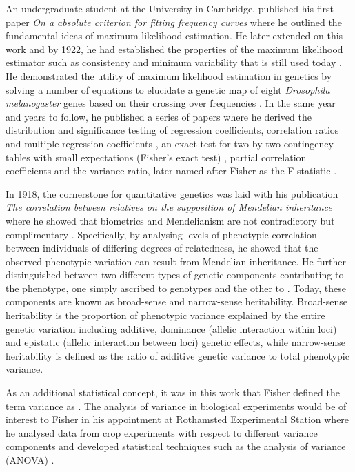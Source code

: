 An undergraduate student at the University in Cambridge, \citet{Fisher1912} published his first paper \textit{On a absolute criterion for fitting frequency curves} where he outlined the fundamental ideas of maximum likelihood estimation. He later extended on this work and by 1922, he had established the properties of the maximum likelihood estimator such as consistency and minimum variability \citep{Fisher1922a} that is still used today \citep{Hald1999}. He demonstrated the utility of maximum likelihood estimation in genetics by solving a number of equations to elucidate a genetic map of eight \textit{Drosophila melanogaster} genes based on their crossing over frequencies \citep{Fisher1922b}. In the same year and years to follow, he published a series of papers where he derived the distribution and significance testing of regression coefficients, correlation ratios and multiple regression coefficients \citep{Fisher1922c,Fisher1928}, an exact test for two-by-two contingency tables with small expectations (Fisher's exact test) \citep{Fisher1922d}, partial correlation coefficients \citep{Fisher1924a} and the variance ratio, later named after Fisher as the F statistic \citep{Fisher1924b}. 

In 1918, the cornerstone for quantitative genetics was laid with his publication \textit{The correlation between relatives on the supposition of Mendelian inheritance} where he showed that biometrics and Mendelianism are not contradictory but complimentary \citep{Fisher1918}. Specifically, by analysing levels of phenotypic correlation between individuals of differing degrees of relatedness, he showed that the observed phenotypic variation can result from Mendelian inheritance. He further distinguished between two different types of genetic components contributing to the phenotype, one simply ascribed to genotypes and the other to . Today, these components are known as broad-sense and narrow-sense heritability. Broad-sense heritability is the proportion of phenotypic variance explained by the entire genetic variation including additive, dominance (allelic interaction within loci) and epistatic (allelic interaction between loci) genetic effects, while narrow-sense heritability is defined as the ratio of additive genetic variance to total phenotypic variance. 

As an additional statistical concept, it was in this work that Fisher defined the term variance as . The analysis of variance in biological experiments would be of interest to Fisher in his appointment at Rothamsted Experimental Station where he analysed data from crop experiments with respect to different variance components and developed statistical techniques such as the analysis of variance (ANOVA) \citep{Fisher1921,Fisher1923,Eden1929}. 

